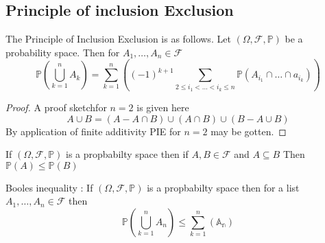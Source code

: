 \documentclass{article}
\begin{document}
\subsection{Principle of inclusion Exclusion}
\begin{proposition}
    The Principle of Inclusion Exclusion is as follows. Let $(\Omega,\mathcal{F},\mathbb{P})$ be a probability space. Then for $A_1,\dots,A_n \in \mathcal{F}$
    \[\mathbb{P}\left(\bigcup_{k=1}^n A_k \right) = \sum_{k=1}^{n}\left((-1)^{k+1}\sum_{2 \le i_1 < \dots < i_k \le n }\mathbb{P}(A_{i_1} \cap \dots \cap a_{i_k})\right)\] 
\end{proposition}
\begin{proof}
    A proof sketchfor $n = 2$ is given here
    \[A \cup B = (A - A \cap B) \cup (A \cap B) \cup (B - A \cup B)\]
    By application of finite additivity PIE for $n = 2$ may be gotten. 
\end{proof}
\begin{proposition}
    If $(\Omega,\mathcal{F},\mathbb{P})$ is a propbabilty space then if $A,B \in \mathcal{F}$ and $A \subseteq B$ Then $\mathbb{P}(A) \le \mathbb{P}(B)$
\end{proposition}
\begin{proposition}
    Booles inequality : If $(\Omega,\mathcal{F},\mathbb{P})$ is a propbabilty space then for a list $A_1,\dots,A_n \in \mathcal{F}$ then
    \[\mathbb{P}\left(\bigcup_{k=1}^n A_n\right) \le \sum_{k=1}^{n}(\mathbb{A_n})\] 
\end{proposition}
\end{document}
